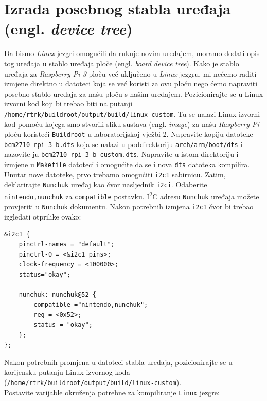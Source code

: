 \documentclass[11pt]{article}
\begin{document}
\section{Izrada posebnog stabla uređaja (engl. \textit{device tree})}
Da bismo \textit{Linux} jezgri omogućili da rukuje novim uređajem, moramo dodati
opis tog uređaja u stablo uređaja ploče (engl. \textit{board device tree}).
Kako je stablo uređaja za \textit{Raspberry Pi 3} ploču već uključeno u
\textit{Linux} jezgru, mi nećemo raditi izmjene direktno u datoteci koja se već
koristi za ovu ploču nego ćemo napraviti posebno stablo uređaja za našu ploču
s našim uređajem.
\newline
\newline
Pozicionirajte se u Linux izvorni kod koji bi trebao biti na putanji\\
\texttt{/home/rtrk/buildroot/output/build/linux-custom}. Tu se nalazi Linux
izvorni kod pomoću kojega smo stvorili sliku sustava (engl. \textit{image})
za našu \textit{Raspberry Pi} ploču koristeći \texttt{Buildroot} u laboratorijskoj
vježbi 2. Napravite kopiju datoteke \texttt{bcm2710-rpi-3-b.dts} koja se nalazi
u poddirektoriju \texttt{arch/arm/boot/dts} i nazovite ju \texttt{bcm2710-rpi-3-b-custom.dts}.
Napravite u istom direktoriju i izmjene u \texttt{Makefile} datoteci i
omogućite da se i nova \texttt{dts} datoteka kompilira.
\newline
\newline
Unutar nove datoteke, prvo trebamo omogućiti \texttt{i2c1} sabirnicu.
Zatim, deklarirajte \texttt{Nunchuk} uređaj kao čvor nasljednik \texttt{i2ci}.
Odaberite \texttt{nintendo,nunchuk} za \texttt{compatible} postavku.
I\textsuperscript{2}C adresu \texttt{Nunchuk} uređaja možete provjeriti u
\texttt{Nunchuk} dokumentu.
\newline
Nakon potrebnih izmjena \texttt{i2c1} čvor bi trebao izgledati otprilike ovako:
\begin{lstlisting}
&i2c1 {
	pinctrl-names = "default";
	pinctrl-0 = <&i2c1_pins>;
	clock-frequency = <100000>;
	status="okay";

	nunchuk: nunchuk@52 {
		compatible ="nintendo,nunchuk";
		reg = <0x52>;
		status = "okay";
	};
};
\end{lstlisting}
Nakon potrebnih promjena u datoteci stabla uređaja, pozicionirajte se u
korijensku putanju Linux izvornog koda\\
(\texttt{/home/rtrk/buildroot/output/build/linux-custom}).\\
Postavite varijable okruženja potrebne za kompiliranje \texttt{Linux} jezgre:
\end{document}
